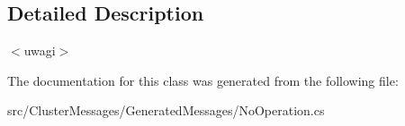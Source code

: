 \subsection{Detailed Description}
$<$uwagi$>$ 

The documentation for this class was generated from the following file\+:\begin{DoxyCompactItemize}
\item 
src/\+Cluster\+Messages/\+Generated\+Messages/No\+Operation.\+cs\end{DoxyCompactItemize}
